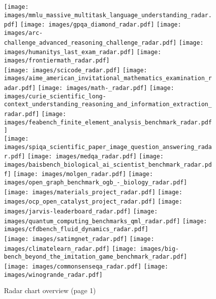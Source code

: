 
\begin{figure}[ht!]
\centering
\texttt{[image: images/mmlu\_massive\_multitask\_language\_understanding\_radar.pdf]}
\texttt{[image: images/gpqa\_diamond\_radar.pdf]}
\texttt{[image: images/arc-challenge\_advanced\_reasoning\_challenge\_radar.pdf]}
\texttt{[image: images/humanitys\_last\_exam\_radar.pdf]}
\texttt{[image: images/frontiermath\_radar.pdf]}
\\[1ex]
\texttt{[image: images/scicode\_radar.pdf]}
\texttt{[image: images/aime\_american\_invitational\_mathematics\_examination\_radar.pdf]}
\texttt{[image: images/math-\_radar.pdf]}
\texttt{[image: images/curie\_scientific\_long-context\_understanding\_reasoning\_and\_information\_extraction\_radar.pdf]}
\texttt{[image: images/feabench\_finite\_element\_analysis\_benchmark\_radar.pdf]}
\\[1ex]
\texttt{[image: images/spiqa\_scientific\_paper\_image\_question\_answering\_radar.pdf]}
\texttt{[image: images/medqa\_radar.pdf]}
\texttt{[image: images/baisbench\_biological\_ai\_scientist\_benchmark\_radar.pdf]}
\texttt{[image: images/molgen\_radar.pdf]}
\texttt{[image: images/open\_graph\_benchmark\_ogb\_-\_biology\_radar.pdf]}
\\[1ex]
\texttt{[image: images/materials\_project\_radar.pdf]}
\texttt{[image: images/ocp\_open\_catalyst\_project\_radar.pdf]}
\texttt{[image: images/jarvis-leaderboard\_radar.pdf]}
\texttt{[image: images/quantum\_computing\_benchmarks\_qml\_radar.pdf]}
\texttt{[image: images/cfdbench\_fluid\_dynamics\_radar.pdf]}
\\[1ex]
\texttt{[image: images/satimgnet\_radar.pdf]}
\texttt{[image: images/climatelearn\_radar.pdf]}
\texttt{[image: images/big-bench\_beyond\_the\_imitation\_game\_benchmark\_radar.pdf]}
\texttt{[image: images/commonsenseqa\_radar.pdf]}
\texttt{[image: images/winogrande\_radar.pdf]}
\\[1ex]
\caption{Radar chart overview (page 1)}
\end{figure}

